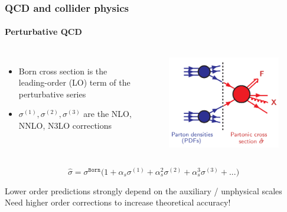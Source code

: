 \documentclass[aspectratio=43]{beamer}
\begin{document}
\begin{frame}
	
	\frametitle{QCD and collider physics}
	\framesubtitle{Perturbative QCD}
	
	\begin{columns}
	
	
	\begin{itemize}
		\item \footnotesize Born cross section is the leading-order (LO) term of the perturbative series
		\item \footnotesize $\sigma^{(1)}, \sigma^{(2)}, \sigma^{(3)}$ are the NLO, NNLO, N3LO corrections
	\end{itemize}
	
	\begin{figure}[!htb]
		\includegraphics[width = 5 cm]{plots/part1/chapter2/factorization_3.png}
	\end{figure}
	
	\end{columns}
	
	\begin{equation}
		\hat{\sigma} = \sigma^{\texttt{Born}} \Big( 1 +
		\alpha_{s} \sigma^{(1)} + 
		\alpha_{s}^{2} \sigma^{(2)} + 
		\alpha_{s}^{3} \sigma^{(3)} + ... \Big) \nonumber
	\end{equation}
	
	\footnotesize Lower order predictions strongly depend on the auxiliary / unphysical scales \\ {\color{red}Need higher order corrections to increase theoretical accuracy!}

\end{frame}
\end{document}
